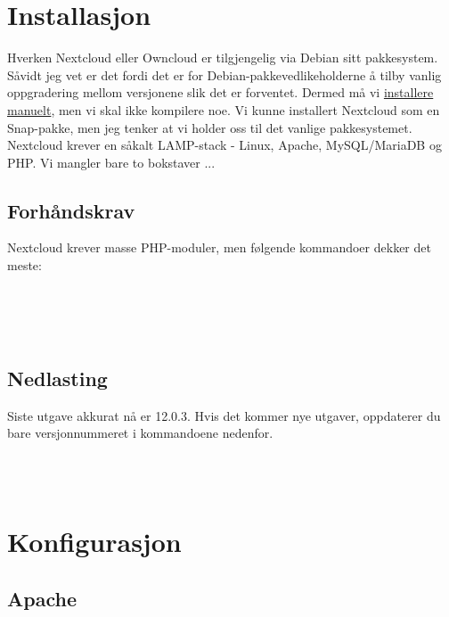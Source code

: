 \section{Installasjon}

Hverken Nextcloud eller Owncloud er tilgjengelig via Debian sitt 
pakkesystem. Såvidt jeg vet er det fordi det er 
for Debian-pakkevedlikeholderne å tilby vanlig oppgradering 
mellom versjonene slik det er forventet. Dermed må vi 
\href{https://docs.nextcloud.com/server/12/admin_manual/installation/source_installation.html}{installere manuelt}, 
men vi skal ikke kompilere noe. Vi kunne installert
Nextcloud som en Snap-pakke, men jeg tenker at vi holder oss til
det vanlige pakkesystemet. Nextcloud krever en såkalt LAMP-stack - 
Linux, Apache, MySQL/MariaDB og PHP. Vi mangler bare to bokstaver ...

\subsection*{Forhåndskrav}

Nextcloud krever masse PHP-moduler, men følgende kommandoer dekker det meste:

\\
\\
\\

\subsection*{Nedlasting}

Siste utgave akkurat nå er 12.0.3. Hvis det kommer nye utgaver, oppdaterer du bare
versjonnummeret i kommandoene nedenfor.

\\
\\

\section{Konfigurasjon}

\subsection*{Apache}

